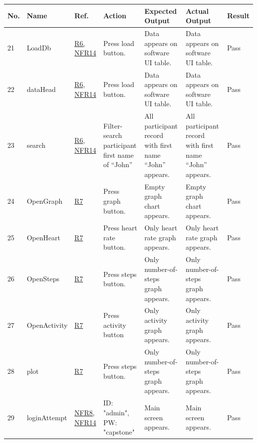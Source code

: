 \documentclass[12pt, titlepage]{article}
\begin{document}
\begin{center}
\begin{table} 
\begin{tabular}{ | p{0.5cm} | p{2.8cm} |  p{1.1cm} | p{2.7cm} | p{2.7cm} | p{2.7cm} | p{1.1cm} |}
\hline
\textbf{No.} & \textbf{Name}  & \textbf{Ref.} & \textbf{Action} & \textbf{Expected Output} & \textbf{Actual Output} & \textbf{Result} \\
\hline
21 & LoadDb & \href{https://github.com/zakerl/Capstone_Project/blob/main/docs/SRS/SRS.pdf}{R6, NFR14} & Press load button. & Data appears on software UI table. &  Data appears on software UI table. & Pass \\ 
\hline
22 & dataHead & \href{https://github.com/zakerl/Capstone_Project/blob/main/docs/SRS/SRS.pdf}{R6, NFR14} & Press load button. & Data appears on software UI table. & Data appears on software UI table. & Pass \\ 
\hline
23 & search & \href{https://github.com/zakerl/Capstone_Project/blob/main/docs/SRS/SRS.pdf}{R6, NFR14} & Filter-search participant first name of “John” & All participant record with first name “John” appears. & All participant record with first name “John” appears. & Pass \\ 
\hline
24 & OpenGraph & \href{https://github.com/zakerl/Capstone_Project/blob/main/docs/SRS/SRS.pdf}{R7} & Press graph button. & Empty graph chart appears. & Empty graph chart appears. & Pass \\ 
\hline
25 & OpenHeart & \href{https://github.com/zakerl/Capstone_Project/blob/main/docs/SRS/SRS.pdf}{R7} & Press heart rate button. & Only heart rate graph appears. & Only heart rate graph appears. & Pass \\ 
\hline
26 & OpenSteps & \href{https://github.com/zakerl/Capstone_Project/blob/main/docs/SRS/SRS.pdf}{R7} & Press steps button. & Only number-of-steps graph appears. & Only number-of-steps graph appears. & Pass \\ 
\hline
27 & OpenActivity & \href{https://github.com/zakerl/Capstone_Project/blob/main/docs/SRS/SRS.pdf}{R7} & Press activity button & Only activity graph appears. & Only activity graph appears. & Pass \\ 
\hline
28 & plot & \href{https://github.com/zakerl/Capstone_Project/blob/main/docs/SRS/SRS.pdf}{R7} & Press steps button. & Only number-of-steps graph appears. & Only number-of-steps graph appears. & Pass \\ 
\hline
29 & loginAttempt & \href{https://github.com/zakerl/Capstone_Project/blob/main/docs/SRS/SRS.pdf}{NFR8, NFR14} & ID: "admin", PW: "capstone" & Main screen appears. & Main screen appears. & Pass \\ 

\end{tabular}
\end{table}
\end{center}
\end{document}
